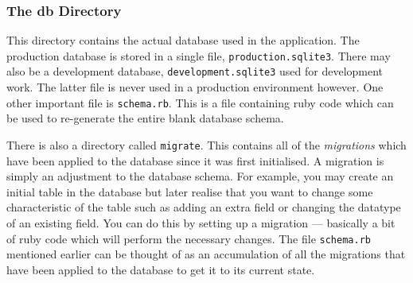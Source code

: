 \documentclass[12pt,twoside]{article}
\begin{document}
\subsubsection{The db Directory}
This directory contains the actual database used in the application.
The production database is stored in a single file, \verb=production.sqlite3=.
There may also be a development database, \verb=development.sqlite3= used
for development work. The latter file is never used in a production environment
however. One other important file is \verb=schema.rb=. This is a file
containing ruby code which can be used to re-generate the entire blank
database schema.

There is also a directory called \verb=migrate=. This contains all of the
\emph{migrations} which have been applied to the database since it was
first initialised. A migration is simply an adjustment to the database
schema. For example, you may create an initial table in the database but
later realise that you want to change some characteristic of the table
such as adding an extra field or changing the datatype of an existing field.
You can do this by setting up a migration --- basically a bit of ruby code
which will perform the necessary changes. 
The file \verb=schema.rb= mentioned earlier can be
thought of as an accumulation of all the migrations that have been applied
to the database to get it to its current state.
\end{document}
